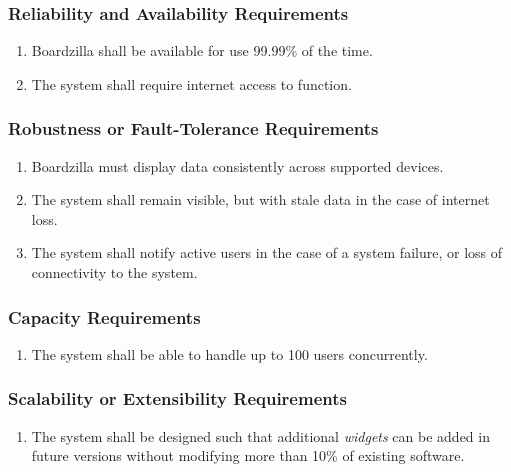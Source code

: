 \documentclass{article}
\begin{document}
\subsubsection{Reliability and Availability Requirements}
\label{ssub:reliability_and_availability_requirements}
\begin{enumerate}[{PR}1. ]
	\item Boardzilla shall be available for use 99.99\% of the time.
	\item The system shall require internet access to function.
\end{enumerate}

\subsubsection{Robustness or Fault-Tolerance Requirements}
\label{ssub:robustness_or_fault_tolerance_requirements}
\begin{enumerate}[{PR}1.]
	\item Boardzilla must display data consistently across supported devices.
	\item The system shall remain visible, but with stale data in the case of internet loss.
	\item The system shall notify active users in the case of a system failure, or loss of connectivity to the system.
\end{enumerate}

\subsubsection{Capacity Requirements}
\label{ssub:capacity_requirements}
\begin{enumerate}[{PR}1. ]
	\item The system shall be able to handle up to 100 users concurrently.
\end{enumerate}

\subsubsection{Scalability or Extensibility Requirements}
\label{ssub:scalability_or_extensibility_requirements}
\begin{enumerate}[{PR}1. ]
	\item The system shall be designed such that additional \textit{widgets} can be added in future versions without modifying more than 10\% of existing software.
\end{enumerate}
\end{document}
